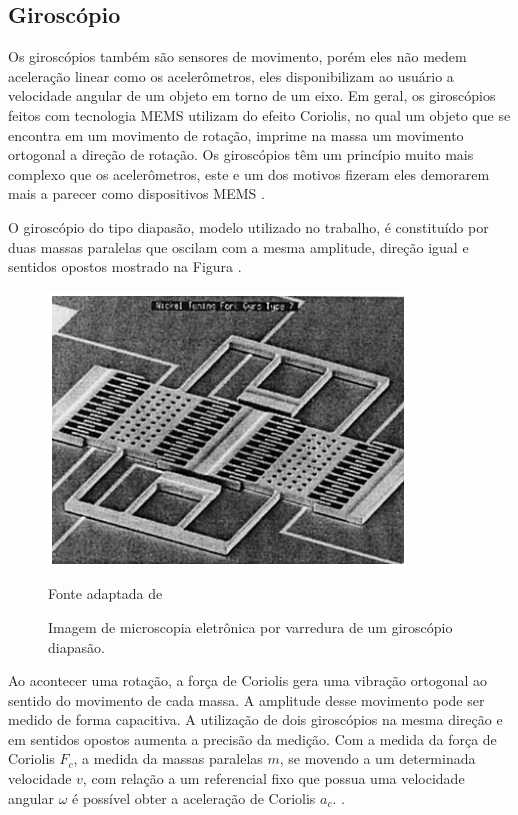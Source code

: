 		\subsection{Giroscópio}
			
			Os giroscópios também são sensores de movimento, porém eles não medem aceleração linear como os acelerômetros, eles disponibilizam ao usuário a velocidade angular de um objeto em torno de um eixo. Em geral, os giroscópios feitos com tecnologia MEMS utilizam do efeito Coriolis, no qual um objeto que se encontra em um movimento de rotação, imprime na massa um movimento ortogonal a direção de rotação. Os giroscópios têm um princípio muito mais complexo que os acelerômetros, este e um dos motivos fizeram eles demorarem mais a parecer como dispositivos MEMS \cite{almeida2014}.
			
			O giroscópio do tipo diapasão, modelo utilizado no trabalho, é constituído por duas massas paralelas que oscilam com a mesma amplitude, direção igual e sentidos opostos mostrado na Figura .
			
			\begin{figure}[h]
				\centering
				\includegraphics[keepaspectratio=true,scale=0.7
				]{figuras/diapasao.png}
				\caption{ Imagem de microscopia eletrônica por varredura de um giroscópio diapasão.}
				Fonte adaptada de \cite{forhan2010}
				\label{gyro}	
			\end{figure}
			
			Ao acontecer uma rotação, a força de Coriolis gera uma vibração ortogonal ao sentido do movimento de cada massa. A amplitude desse movimento pode ser medido de forma capacitiva. A utilização de dois giroscópios na mesma direção e em sentidos opostos aumenta a precisão da medição. Com a medida da força de Coriolis  $F_{c}$, a medida da massas paralelas $m$, se movendo a um determinada velocidade $v$, com relação a um referencial fixo que possua uma velocidade angular $ \omega $ é possível obter a aceleração de Coriolis $a_{c}$. \cite{forhan2010}.
			
